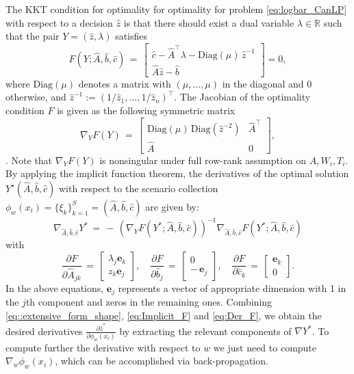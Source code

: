\documentclass{article}
\newcommand{\e}{\textbf{e}}
\begin{document}
The KKT condition for optimality for optimality for problem \ref{eq:logbar_CanLP} with respect to a decision $\hat z$ is that there should exist a dual variable $\lambda \in \mathbb{R}$ such that the pair $Y =  (\hat z,\lambda)$ satisfies
\begin{equation}
    F(Y;\hat A,\hat b,\hat c) \,=\,
    \begin{bmatrix}
        \hat c - \hat A^\top \lambda - \mathrm{Diag}(\mu)\,\hat z^{-1} \\ \hat A \hat z - \hat b
    \end{bmatrix}
    = 0,
\end{equation}
where $\mathrm{Diag}(\mu)$ denotes a matrix with $(\mu,\ldots,\mu)$ in the diagonal  and 0 otherwise, and $\hat z^{-1} := (1/\hat z_1,\dots,1/\hat z_n)^\top$.
The Jacobian of the optimality condition $F$ is given as the following symmetric matrix
\begin{equation}
    \nabla_{Y} F(Y) \,=\,
    \begin{bmatrix}
        \mathrm{Diag}(\mu)\,\mathrm{Diag}(\hat z^{-2}) & \hat A^\top \\ \hat A & 0
    \end{bmatrix}
    ,
\end{equation}
 . Note that $ \nabla_{Y} F(Y)$ is nonsingular under full row-rank assumption on $A, W_i, T_i$. By applying the implicit function theorem, the derivatives  of the optimal solution $Y^\star(\hat A,\hat b,\hat c)$ with respect to the scenario collection $\phi_w(x_i)= \{\xi_k\}_{k=1}^S=(\hat A,\hat b,\hat c)$ are given by:
\begin{equation}
    \label{eq:Implicit_F}
    \nabla_{\hat A,\hat b,\hat c}Y^* \,=\, -\,\left(\nabla_{Y}  F(Y^*;\hat A,\hat b,\hat c)\right)^{-1}\nabla_{\hat A,\hat b,\hat c}F(Y^*;\hat A,\hat b,\hat c)
\end{equation}
with
\begin{equation}
    \label{eq:Der_F}
    \frac{\partial F}{\partial \hat A_{jk}} \,=\,
    \begin{bmatrix}
        \lambda_j  \e_k \\ z_k \e_j
    \end{bmatrix}
    ,\quad
    \frac{\partial F}{\partial \hat b_j} \,=\,
    \begin{bmatrix}
        0 \\ -\,\e_j
    \end{bmatrix}
    ,\quad
    \frac{\partial F}{\partial \hat c_k} \,=\,
    \begin{bmatrix}
        \e_k \\ 0
    \end{bmatrix}
    .
\end{equation}
In the above equations, $\e_j$ represents a vector of appropriate dimension with 1 in the $j$th component and zeros in the remaining ones. 
Combining \eqref{eq::extensive_form_shape},
\eqref{eq:Implicit_F} and \eqref{eq:Der_F}, we obtain the desired derivatives
$\tfrac{\partial \hat{z}^*}{\partial \phi_w(x_i)}$ by extracting the relevant
components of $ \nabla Y^*$. To compute further the derivative with respect to $w$ we just need to compute $\nabla_w \phi_w(x_i)$, which can be accomplished via back-propagation.
\end{document}
